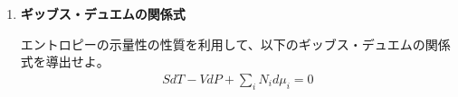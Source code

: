 \documentclass[uplatex,dvipdfmx,a4paper,11pt]{jsarticle}
\begin{document}
\begin{enumerate}
\item
{\bf ギッブス・デュエムの関係式}

エントロピーの示量性の性質を利用して、以下のギッブス・デュエムの関係式を導出せよ。
\begin{align*}
S dT -V dP + \sum_i N_i d\mu_i = 0
\end{align*}

%
%
%

\end{enumerate}
\end{document}
